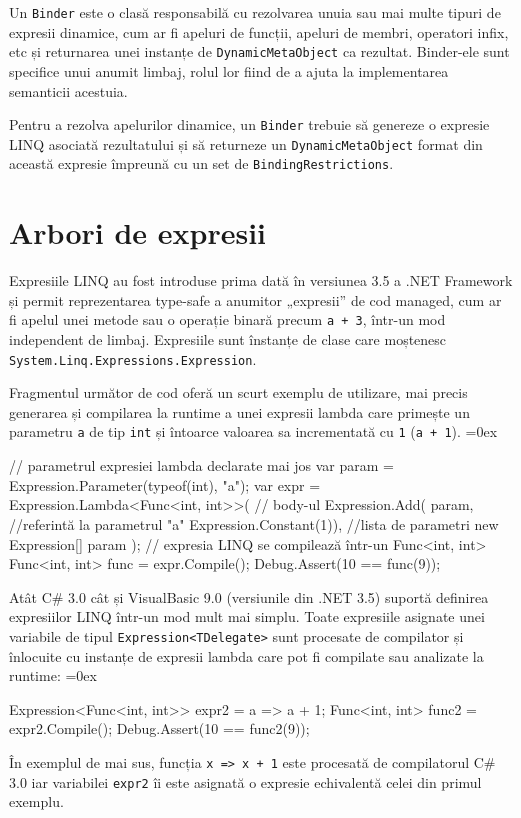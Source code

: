 \documentclass[12pt,a4paper]{memoir}
\renewcommand{\c}{\texttt}
\newenvironment{code}
{
\definecolor{shadecolor}{gray}{0.91}
\topsep=0ex
\relax
\shaded
\verbatim
}
{
\endverbatim
\endshaded
}
\begin{document}
Un \c{Binder} este o clasă responsabilă cu rezolvarea unuia sau mai multe tipuri de expresii dinamice, cum ar fi apeluri de funcții, apeluri de membri, operatori infix, etc și returnarea unei instanțe de \c{DynamicMetaObject} ca rezultat. Binder-ele sunt specifice unui anumit limbaj, rolul lor fiind de a ajuta la implementarea semanticii acestuia.

Pentru a rezolva apelurilor dinamice, un \c{Binder} trebuie să genereze o expresie LINQ asociată rezultatului și să returneze un \c{DynamicMetaObject} format din această expresie împreună cu un set de \c{BindingRestrictions}.

\section{Arbori de expresii}

Expresiile LINQ au fost introduse prima dată în versiunea 3.5 a .NET Framework\cite{expression_trees_35} și permit reprezentarea type-safe a anumitor „expresii” de cod managed, cum ar fi apelul unei metode sau o operație binară precum \c{a + 3}, într-un mod independent de limbaj. Expresiile sunt înstanțe de clase care moștenesc \c{System.Linq.Expressions.Expression}.

Fragmentul următor de cod oferă un scurt exemplu de utilizare, mai precis generarea și compilarea la runtime a unei expresii lambda care primește un parametru \c{a} de tip \c{int} și întoarce valoarea sa incrementată cu \c{1} (\c{a + 1}).
\begin{code}
// parametrul expresiei lambda declarate mai jos
var param = Expression.Parameter(typeof(int), "a");
var expr =
  Expression.Lambda<Func<int, int>>(
    // body-ul
    Expression.Add(
      param, //referintă la parametrul "a"
      Expression.Constant(1)),
    //lista de parametri
    new Expression[] { param });
// expresia LINQ se compilează într-un Func<int, int>
Func<int, int> func = expr.Compile();
Debug.Assert(10 == func(9));
\end{code}

Atât C\# 3.0 cât și VisualBasic 9.0 (versiunile din .NET 3.5) suportă definirea expresiilor LINQ într-un mod mult mai simplu. Toate expresiile asignate unei variabile de tipul \c{Expression<TDelegate>} sunt procesate de compilator și înlocuite cu instanțe de expresii lambda care pot fi compilate sau analizate la runtime:
\begin{code}
Expression<Func<int, int>> expr2 = a => a + 1;
Func<int, int> func2 = expr2.Compile();
Debug.Assert(10 == func2(9));
\end{code}
În exemplul de mai sus, funcția \c{x => x + 1} este procesată de compilatorul C\# 3.0 iar variabilei \c{expr2} îi este asignată o expresie echivalentă celei din primul exemplu.
\end{document}
